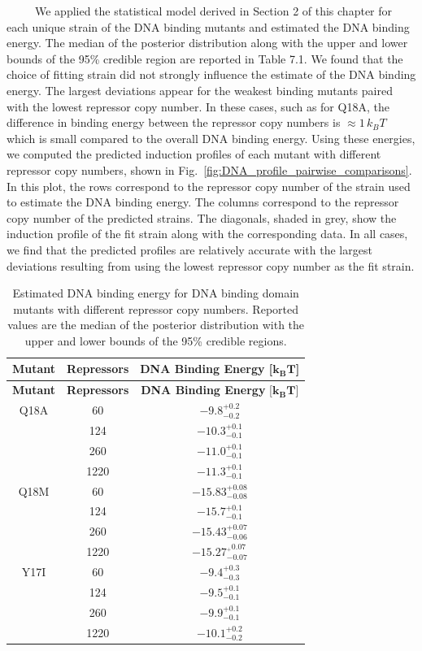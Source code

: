 \documentclass[12pt]{caltech_thesis}
\begin{document}
~~~~~We applied the statistical model derived in Section 2 of this
chapter for each unique strain of the DNA binding mutants and estimated
the DNA binding energy. The median of the posterior distribution along
with the upper and lower bounds of the 95\% credible region are reported
in Table 7.1. We found that the choice of fitting strain did not
strongly influence the estimate of the DNA binding energy. The largest
deviations appear for the weakest binding mutants paired with the lowest
repressor copy number. In these cases, such as for Q18A, the difference
in binding energy between the repressor copy numbers is
\(\approx 1\, k_BT\) which is small compared to the overall DNA binding
energy. Using these energies, we computed the predicted induction
profiles of each mutant with different repressor copy numbers, shown in
Fig.~\ref{fig:DNA_profile_pairwise_comparisons}. In this plot, the rows
correspond to the repressor copy number of the strain used to estimate
the DNA binding energy. The columns correspond to the repressor copy
number of the predicted strains. The diagonals, shaded in grey, show the
induction profile of the fit strain along with the corresponding data.
In all cases, we find that the predicted profiles are relatively
accurate with the largest deviations resulting from using the lowest
repressor copy number as the fit strain.

\begin{longtable}[]{@{}ccc@{}}
\caption{Estimated DNA binding energy for DNA binding domain mutants
with different repressor copy numbers. Reported values are the median of
the posterior distribution with the upper and lower bounds of the 95\%
credible regions.}\tabularnewline
\toprule()
\textbf{Mutant} & \textbf{Repressors} & \textbf{DNA Binding Energy}
{[}\(\mathbf{k_BT}\){]} \\
\midrule()
\endfirsthead
\toprule()
\textbf{Mutant} & \textbf{Repressors} & \textbf{DNA Binding Energy}
{[}\(\mathbf{k_BT}\){]} \\
\midrule()
\endhead
Q18A & 60 & \(-9.8_{-0.2}^{+0.2}\) \\
& 124 & \(-10.3_{-0.1}^{+0.1}\) \\
& 260 & \(-11.0_{-0.1}^{+0.1}\) \\
& 1220 & \(-11.3_{-0.1}^{+0.1}\) \\
Q18M & 60 & \(-15.83^{+0.08}_{-0.08}\) \\
& 124 & \(-15.7_{-0.1}^{+0.1}\) \\
& 260 & \(-15.43_{-0.06}^{+0.07}\) \\
& 1220 & \(-15.27_{-0.07}^{_+0.07}\) \\
Y17I & 60 & \(-9.4_{-0.3}^{+0.3}\) \\
& 124 & \(-9.5_{-0.1}^{+0.1}\) \\
& 260 & \(-9.9_{-0.1}^{+0.1}\) \\
& 1220 & \(-10.1_{-0.2}^{+0.2}\) \\
\bottomrule()
\end{longtable}
\end{document}
